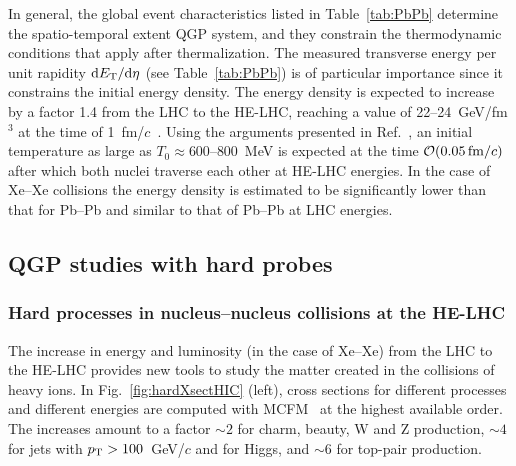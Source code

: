 \documentclass[../report.tex]{subfiles}
\begin{document}
In general, the global event characteristics listed in Table~\ref{tab:PbPb} determine the spatio-temporal extent QGP system, and they
constrain the thermodynamic conditions that apply after thermalization. The measured transverse energy per unit rapidity ${\rm d}E_{\rm T}/{\rm d}\eta$ (see Table~\ref{tab:PbPb})
is of particular importance since it constrains the initial energy density. 
The energy density is expected to increase by a factor 1.4 from the LHC to the HE-LHC, reaching a value of 22--24~GeV/fm$^3$ at the time of 1~fm/$c$~\cite{Dainese:2016gch}. 
Using the arguments presented in Ref.~\cite{Dainese:2016gch}, an initial temperature as large
as $T_0\approx 600$--$800$~MeV is expected at the time $\mathcal{O}(0.05\, {\rm fm}/c)$ after which both nuclei traverse each other at HE-LHC energies.
In the case of Xe--Xe collisions the energy density is estimated to be significantly lower than that for Pb--Pb and similar to that of Pb--Pb at LHC energies.


\subsection{QGP studies with hard probes}
\label{sec:HE_hardprobes}


\subsubsection{Hard processes in nucleus--nucleus collisions at the HE-LHC}
\label{sec:HE_xsections}

The increase in energy and luminosity (in the case of Xe--Xe) from the LHC to the HE-LHC provides new tools to study the matter created in the collisions of heavy ions.
In Fig.~\ref{fig:hardXsectHIC} (left), cross sections for different processes
and different energies are computed with  MCFM~\cite{Campbell:2010ff}
at the highest available order. The increases amount to a factor
$\sim 2$ for charm, beauty, W and Z production, $\sim 4$ for jets with $p\sb{\scriptstyle\mathrm{T}}>100$~GeV/$c$ and for Higgs, and $\sim 6$ for top-pair production. 
\end{document}
